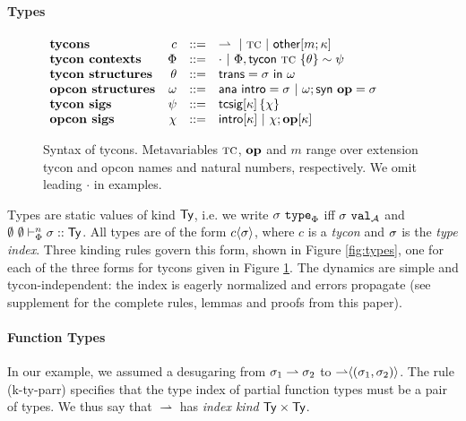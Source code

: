 \documentclass[preprint]{sigplanconf}
\newcommand{\rulename}[1]{(#1)}
\begin{document}
\paragraph{Types}\label{types}


\begin{figure}[t]
\small
$\begin{array}{lrcl}
\textbf{tycons} & c & ::= & \rightharpoonup ~|~ \textsc{tc} ~|~ {\sf other}[m; \kappa]\\
\textbf{tycon contexts} & \Phi & ::= & \cdot ~|~ \Phi, {\sf tycon}~\textsc{tc} ~\{\theta\} \sim \psi\\
\textbf{tycon structures} & \theta & ::= & {\sf trans}=\sigma~{\sf in}~\omega \\
\textbf{opcon structures} & \omega & ::= & {\sf ana}~{\sf intro}=\sigma ~|~ \omega; {\sf syn}~\textbf{op}=\sigma\\
\textbf{tycon sigs} & \psi & ::= & {\sf tcsig}[\kappa]\,\{\chi\}\\
\textbf{opcon sigs}& \chi & ::= & {\sf intro}[\kappa] ~|~ \chi; \textbf{op}[\kappa]\\
\end{array}$
\caption{Syntax of tycons. Metavariables $\textsc{tc}$, $\textbf{op}$ and $m$ range over extension tycon and opcon names and natural numbers, respectively. We omit leading $\cdot$ in examples.}
\label{syntax-TC}\vspace{-8px}
\end{figure}

Types are static values of kind ${\sf Ty}$, i.e. we write $\sigma~\mathtt{type}_{\Phi}$  iff $\sigma~\mathtt{val}_{\mathcal{A}}$ and $\emptyset~\emptyset \vdash_{\Phi}^{n} \sigma :: {\sf Ty}$. All types are of the form ${c}\langle\sigma\rangle$, where $c$ is a \emph{tycon} and $\sigma$ is the \emph{type index}. Three kinding rules govern this form, shown in Figure \ref{fig:types}, one for each of the three forms for tycons given in Figure \ref{syntax-TC}.  The dynamics are simple and tycon-independent: the index is eagerly normalized and errors propagate (see supplement for the complete rules, lemmas and proofs from this paper). 

\paragraph{Function Types} In our example, we assumed a desugaring from $\sigma_1 \rightharpoonup \sigma_2$ to ${\rightharpoonup}\langle(\sigma_1, \sigma_2)\rangle$. The rule \rulename{k-ty-parr} specifies that the type index of partial function types must be a pair of types. We thus say that $\rightharpoonup$ has \emph{index kind} ${\sf Ty} \times {\sf Ty}$. %
\end{document}
